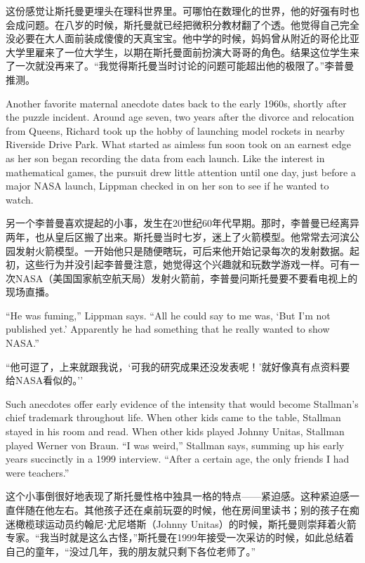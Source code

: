 \ifdefined\chs
这份感觉让斯托曼更埋头在理科世界里。可哪怕在数理化的世界，他的好强有时也会成问题。在八岁的时候，斯托曼就已经把微积分教材翻了个透。他觉得自己完全没必要在大人面前装成傻傻的天真宝宝。他中学的时候，妈妈曾从附近的哥伦比亚大学里雇来了一位大学生，以期在斯托曼面前扮演大哥哥的角色。结果这位学生来了一次就没再来了。``我觉得斯托曼当时讨论的问题可能超出他的极限了。''李普曼推测。
\fi

\ifdefined\eng
Another favorite maternal anecdote dates back to the early 1960s, shortly after the puzzle incident. Around age seven, two years after the divorce and relocation from Queens, Richard took up the hobby of launching model rockets in nearby Riverside Drive Park. What started as aimless fun soon took on an earnest edge as her son began recording the data from each launch. Like the interest in mathematical games, the pursuit drew little attention until one day, just before a major NASA launch, Lippman checked in on her son to see if he wanted to watch.
\fi

\ifdefined\chs
另一个李普曼喜欢提起的小事，发生在20世纪60年代早期。那时，李普曼已经离异两年，也从皇后区搬了出来。斯托曼当时七岁，迷上了火箭模型。他常常去河滨公园发射火箭模型。一开始他只是随便瞎玩，可后来他开始记录每次的发射数据。起初，这些行为并没引起李普曼注意，她觉得这个兴趣就和玩数学游戏一样。可有一次NASA（美国国家航空航天局）发射火箭前，李普曼问斯托曼要不要看电视上的现场直播。
\fi

\ifdefined\eng
``He was fuming,'' Lippman says. ``All he could say to me was, `But I'm not published yet.' Apparently he had something that he really wanted to show NASA.''
\fi

\ifdefined\chs
``他可逗了，上来就跟我说，`可我的研究成果还没发表呢！'就好像真有点资料要给NASA看似的。''
\fi

\ifdefined\eng
Such anecdotes offer early evidence of the intensity that would become Stallman's chief trademark throughout life. When other kids came to the table, Stallman stayed in his room and read. When other kids played Johnny Unitas, Stallman played Werner von Braun. ``I was weird,'' Stallman says, summing up his early years succinctly in a 1999 interview. ``After a certain age, the only friends I had were teachers.''%
\fi

\ifdefined\chs
这个小事倒很好地表现了斯托曼性格中独具一格的特点——紧迫感。这种紧迫感一直伴随在他左右。其他孩子还在桌前玩耍的时候，他在房间里读书；别的孩子在痴迷橄榄球运动员约翰尼⋅尤尼塔斯（Johnny Unitas）的时候，斯托曼则崇拜着火箭专家。``我当时就是这么古怪，''斯托曼在1999年接受一次采访的时候，如此总结着自己的童年，``没过几年，我的朋友就只剩下各位老师了。'' %
\fi

